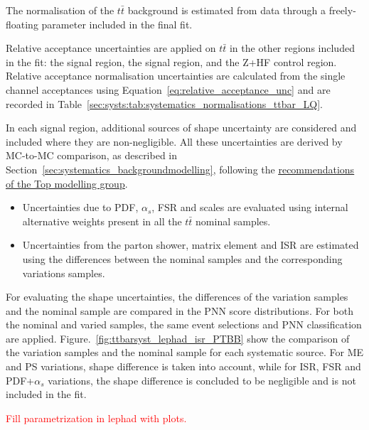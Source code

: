 The normalisation of the $t\bar{t}$ background is estimated from data through a freely-floating parameter included in the final fit. %

Relative acceptance uncertainties are applied on $t\bar{t}$ in the other regions included in the fit: 
the \lephad signal region, the \hadhad signal region, and the Z+HF control region.  Relative acceptance 
normalisation uncertainties are calculated from the single channel acceptances using 
Equation~\ref{eq:relative_acceptance_unc} and are recorded in Table~\ref{sec:systs:tab:systematics_normalisations_ttbar_LQ}.

In each signal region, additional sources of shape uncertainty are 
considered and included where they are non-negligible. All these uncertainties are derived by 
MC-to-MC comparison, as described in Section~\ref{sec:systematics_backgroundmodelling}, following the 
\href{https://twiki.cern.ch/twiki/bin/view/AtlasProtected/TopMCSystematicsR21}{\underline{recommendations of the Top modelling group}}. 

\begin{itemize}
\item Uncertainties due to PDF, $\alpha_s$, FSR and scales are evaluated using internal alternative weights present in all the $t\bar{t}$ nominal samples. 
\item Uncertainties from the parton shower, matrix element and ISR are estimated using the differences between the nominal samples and the corresponding variations samples. 
\end{itemize}

For evaluating the shape uncertainties, the differences of the variation samples and the nominal sample are compared 
in the PNN score distributions. For both the nominal and varied samples, the same event selections and PNN classification are applied. Figure.~\ref{fig:ttbarsyst_lephad_isr_PTBB} 
show the comparison of the variation samples and the nominal sample for each systematic source. 
For ME and PS variations, shape difference is taken into account, while for ISR, FSR and PDF+$\alpha_s$ variations, 
the shape difference is concluded to be negligible and is not included in the fit.

\textcolor{red}{Fill parametrization in lephad with plots.}

